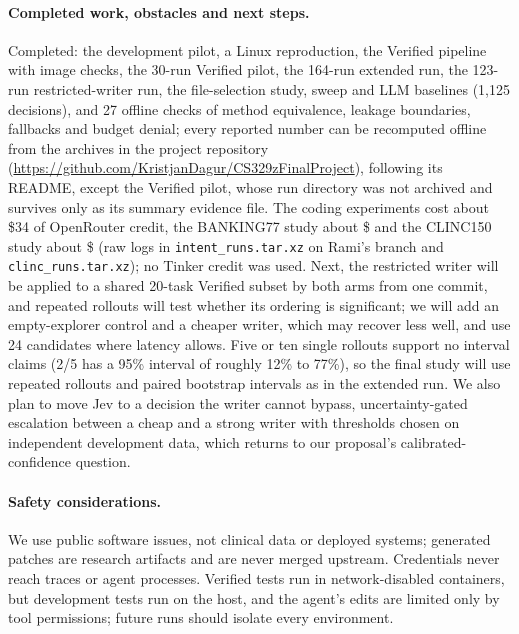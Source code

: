 \documentclass{article}
\begin{document}
\paragraph{Completed work, obstacles and next steps.}
Completed: the development pilot, a Linux reproduction, the Verified pipeline with image checks, the 30-run Verified pilot, the 164-run extended run, the 123-run restricted-writer run, the file-selection study, sweep and LLM baselines (1,125 decisions), and 27 offline checks of method equivalence, leakage boundaries, fallbacks and budget denial; every reported number can be recomputed offline from the archives in the project repository (\url{https://github.com/KristjanDagur/CS329zFinalProject}), following its README, except the Verified pilot, whose run directory was not archived and survives only as its summary evidence file. The coding experiments cost about \$34 of OpenRouter credit, the BANKING77 study about \$\BkSpend{} and the CLINC150 study about \$\ClSpend{} (raw logs in \texttt{intent\_runs.tar.xz} on Rami's branch and \texttt{clinc\_runs.tar.xz}); no Tinker credit was used. Next, the restricted writer will be applied to a shared 20-task Verified subset by both arms from one commit, and repeated rollouts will test whether its ordering is significant; we will add an empty-explorer control and a cheaper writer, which may recover less well, and use 24 candidates where latency allows. Five or ten single rollouts support no interval claims (2/5 has a 95\% interval of roughly 12\% to 77\%), so the final study will use repeated rollouts and paired bootstrap intervals as in the extended run. We also plan to move Jev to a decision the writer cannot bypass, uncertainty-gated escalation between a cheap and a strong writer with thresholds chosen on independent development data, which returns to our proposal's calibrated-confidence question.

\paragraph{Safety considerations.}
We use public software issues, not clinical data or deployed systems; generated patches are research artifacts and are never merged upstream. Credentials never reach traces or agent processes. Verified tests run in network-disabled containers, but development tests run on the host, and the agent's edits are limited only by tool permissions; future runs should isolate every environment.
\end{document}
